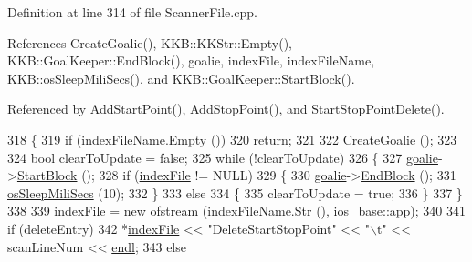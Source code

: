 Definition at line 314 of file Scanner\+File.\+cpp.



References Create\+Goalie(), K\+K\+B\+::\+K\+K\+Str\+::\+Empty(), K\+K\+B\+::\+Goal\+Keeper\+::\+End\+Block(), goalie, index\+File, index\+File\+Name, K\+K\+B\+::os\+Sleep\+Mili\+Secs(), and K\+K\+B\+::\+Goal\+Keeper\+::\+Start\+Block().



Referenced by Add\+Start\+Point(), Add\+Stop\+Point(), and Start\+Stop\+Point\+Delete().


\begin{DoxyCode}
318 \{
319   \textcolor{keywordflow}{if}  (\hyperlink{class_k_k_l_s_c_1_1_scanner_file_a3ef604628bb0a487663326f93845c10e}{indexFileName}.\hyperlink{class_k_k_b_1_1_k_k_str_ac69942f73fffd672ec2a6e1c410afdb6}{Empty} ())
320     \textcolor{keywordflow}{return};
321 
322   \hyperlink{class_k_k_l_s_c_1_1_scanner_file_a08e1b410a871d7dae4828143cec78c32}{CreateGoalie} ();
323 
324   \textcolor{keywordtype}{bool}  clearToUpdate = \textcolor{keyword}{false};
325   \textcolor{keywordflow}{while}  (!clearToUpdate)
326   \{
327     \hyperlink{class_k_k_l_s_c_1_1_scanner_file_aea946a2d0dc2fb27b41ce5180679d3de}{goalie}->\hyperlink{class_k_k_b_1_1_goal_keeper_a2a9565f88cee7b4339c24ed4d5155419}{StartBlock} ();
328     \textcolor{keywordflow}{if}  (\hyperlink{class_k_k_l_s_c_1_1_scanner_file_aa82349c3a370d33508267b609e543f44}{indexFile} != NULL)
329     \{
330       \hyperlink{class_k_k_l_s_c_1_1_scanner_file_aea946a2d0dc2fb27b41ce5180679d3de}{goalie}->\hyperlink{class_k_k_b_1_1_goal_keeper_aee88d11d3466dd77ef3e5b18c87e27fb}{EndBlock} ();
331       \hyperlink{namespace_k_k_b_a6d3dee6d4727244d65814aaade882c59}{osSleepMiliSecs} (10);
332     \}
333     \textcolor{keywordflow}{else}
334     \{
335       clearToUpdate = \textcolor{keyword}{true};
336     \}
337   \}
338 
339   \hyperlink{class_k_k_l_s_c_1_1_scanner_file_aa82349c3a370d33508267b609e543f44}{indexFile} = \textcolor{keyword}{new} ofstream (\hyperlink{class_k_k_l_s_c_1_1_scanner_file_a3ef604628bb0a487663326f93845c10e}{indexFileName}.\hyperlink{class_k_k_b_1_1_k_k_str_ad574e6c0fe7f6ce1ba3ab0a8ce2fbd52}{Str} (), ios\_base::app);
340 
341   \textcolor{keywordflow}{if}  (deleteEntry)
342     *\hyperlink{class_k_k_l_s_c_1_1_scanner_file_aa82349c3a370d33508267b609e543f44}{indexFile} << \textcolor{stringliteral}{"DeleteStartStopPoint"} << \textcolor{stringliteral}{"\(\backslash\)t"} << scanLineNum << \hyperlink{namespace_k_k_b_ad1f50f65af6adc8fa9e6f62d007818a8}{endl};
343   \textcolor{keywordflow}{else}

\end{DoxyCode}
